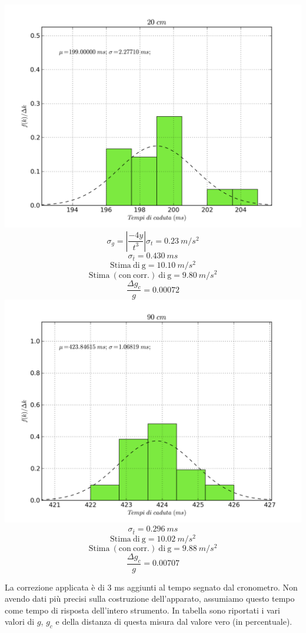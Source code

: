 \begin{center}
\includegraphics[scale=0.70]{../grafici/20cm.png}
$$\sigma_g = |\frac{-4y}{t^3}|\sigma_t = 0.23\  m/s^2$$
$$\sigma_{\bar{t}} = 0.430\ ms$$
$$\mathrm{Stima\ di\ g} = 10.10\ m/s^2$$
$$\mathrm{Stima\ (con\ corr.)\ di\ g} = 9.80\ m/s^2 $$
$$\frac{\Delta g_c}{g} = 0.00072$$
\includegraphics[scale=0.70]{../grafici/90cm.png}
$$\sigma_{\bar{t}} = 0.296\ ms $$
$$\mathrm{Stima\ di\ g} = 10.02\ m/s^2$$
$$\mathrm{Stima\ (con\ corr.)\ di\ g} = 9.88\ m/s^2 $$
$$\frac{\Delta g_c}{g} = 0.00707$$
\end{center}

La correzione applicata è di 3 ms aggiunti al tempo segnato dal cronometro. Non avendo dati più precisi sulla costruzione dell'apparato, assumiamo questo tempo come tempo di risposta dell'intero strumento. In tabella sono riportati i vari valori di $g$, $g_c$ e della distanza di questa misura dal valore vero (in percentuale). 


